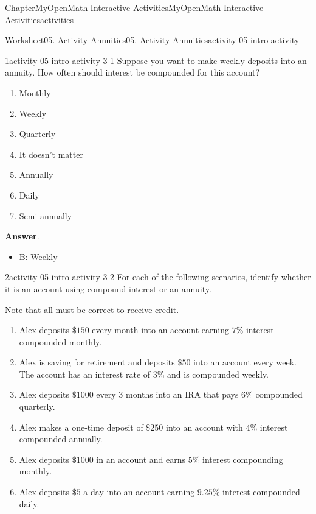 \documentclass[oneside,10pt,]{book}
\newcommand{\blocktitlefont}{\relax}
\newcommand{\ptxlistdisc}{\raisebox{0.3ex}{\textbullet}}
\begin{document}
\begin{chapterptx}{Chapter}{MyOpenMath Interactive Activities}{}{MyOpenMath Interactive Activities}{}{}{activities}
\begin{worksheet-section}{Worksheet}{05. Activity Annuities}{}{05. Activity Annuities}{}{}{activity-05-intro-activity}
\clearpage
\begin{divisionexercise}{1}{}{}{activity-05-intro-activity-3-1}%
Suppose you want to make weekly deposits into an annuity. How often should interest be compounded for this account?%
\par
%
\begin{enumerate}[label={(\alph*)}]
\item{}Monthly%
\item{}Weekly%
\item{}Quarterly%
\item{}It doesn't matter%
\item{}Annually%
\item{}Daily%
\item{}Semi-annually%
\end{enumerate}
%
\par\smallskip%
\noindent\textbf{\blocktitlefont Answer}.\hypertarget{activity-05-intro-activity-3-1-2}{}\quad{}%
\begin{itemize}[label=\ptxlistdisc]
\item{}B: Weekly%
\end{itemize}
%
\end{divisionexercise}%
\begin{divisionexercise}{2}{}{}{activity-05-intro-activity-3-2}%
For each of the following scenarios, identify whether it is an account using compound interest or an annuity.%
\par
Note that all must be correct to receive credit.%
\par
%
\begin{enumerate}[label={(\alph*)}]
\item{}Alex deposits \(\displaystyle\${150}\) every month into an account earning \(\displaystyle{7}\%\) interest compounded monthly.%
\item{}Alex is saving for retirement and deposits \(\displaystyle\${50}\) into an account every week. The account has an interest rate of \(\displaystyle{3}\%\) and is compounded weekly.\textdollar{}%
\item{}Alex deposits \(\displaystyle\${1000}\) every 3 months into an IRA that pays \(\displaystyle{6}\%\) compounded quarterly.%
\item{}Alex makes a one-time deposit of \(\displaystyle\${250}\) into an account with \(\displaystyle{4}\%\) interest compounded annually.%
\item{}Alex deposits \(\displaystyle\${1000}\) in an account and earns \(\displaystyle{5}\%\) interest compounding monthly.%
\item{}Alex deposits \(\displaystyle\${5}\) a day into an account earning \(\displaystyle{9.25}\%\) interest compounded daily.%

\end{enumerate}
\end{divisionexercise}
\end{worksheet-section}
\end{chapterptx}
\end{document}

